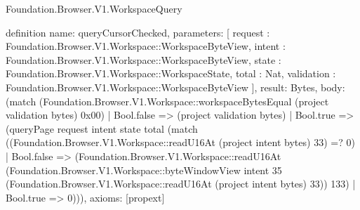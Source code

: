 \begin{lexlean}{Foundation.Browser.V1.WorkspaceQuery}
\begin{semanticmodule}
definition{
  name: queryCursorChecked,
  parameters: [
    request : Foundation.Browser.V1.Workspace::WorkspaceByteView,
    intent : Foundation.Browser.V1.Workspace::WorkspaceByteView,
    state : Foundation.Browser.V1.Workspace::WorkspaceState,
    total : Nat,
    validation : Foundation.Browser.V1.Workspace::WorkspaceByteView
  ],
  result: Bytes,
  body: (match (Foundation.Browser.V1.Workspace::workspaceBytesEqual (project validation bytes) 0x00)
    | Bool.false => (project validation bytes)
    | Bool.true => (queryPage request intent state total (match ((Foundation.Browser.V1.Workspace::readU16At (project intent bytes) 33) =? 0)
      | Bool.false => (Foundation.Browser.V1.Workspace::readU16At (Foundation.Browser.V1.Workspace::byteWindowView intent 35 (Foundation.Browser.V1.Workspace::readU16At (project intent bytes) 33)) 133)
      | Bool.true => 0))),
  axioms: [propext]
}


\end{semanticmodule}
\end{lexlean}
